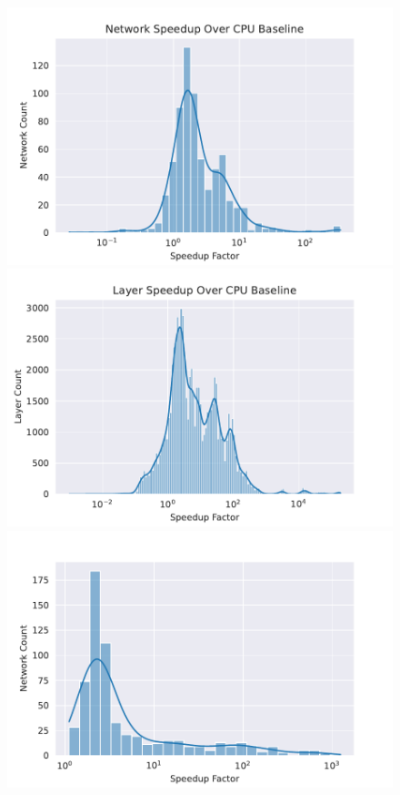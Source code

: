 \begin{figure}
    \centering
    \includegraphics[scale=0.46]{Plots/latency/net_speedup.pdf}
    \hspace{0.1cm} 
    \includegraphics[scale=0.46]{Plots/latency/layer_speedup.pdf}
    \includegraphics[scale=0.46]{Plots/latency/net_speed_w_offload.pdf}

\end{figure}
